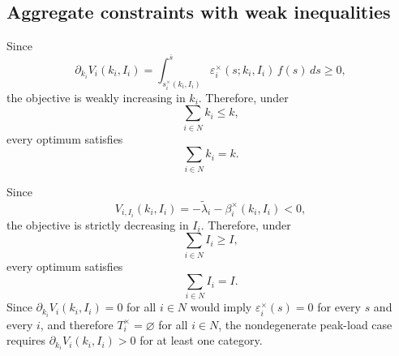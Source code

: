 \documentclass[master.tex]{subfiles}
\begin{document}
\subsection{Aggregate constraints with weak inequalities}

Since
\[
\partial_{k_i}V_i(k_i,I_i)
=
\int_{s_i^\times(k_i,I_i)}^{\overline s}
\varepsilon_i^\times(s;k_i,I_i)\,f(s)\,ds
\ge 0,
\]
the objective is weakly increasing in $k_i$. Therefore, under
\[
\sum_{i\in N} k_i \le k,
\]
every optimum satisfies
\[
\sum_{i\in N} k_i = k.
\]

Since
\[
V_{i,I_i}(k_i,I_i)= -\tilde\lambda_i-\beta_i^\times(k_i,I_i)<0,
\]
the objective is strictly decreasing in $I_i$. Therefore, under
\[
\sum_{i\in N} I_i \ge I,
\]
every optimum satisfies
\[
\sum_{i\in N} I_i = I.
\]
Since $\partial_{k_i}V_i(k_i,I_i)=0$ for all $i\in N$ would imply $\varepsilon_i^\times(s)=0$ for every $s$ and every $i$, and therefore $T_i^\times=\varnothing$ for all $i\in N$, the nondegenerate peak-load case requires $\partial_{k_i}V_i(k_i,I_i)>0$ for at least one category.
\end{document}
